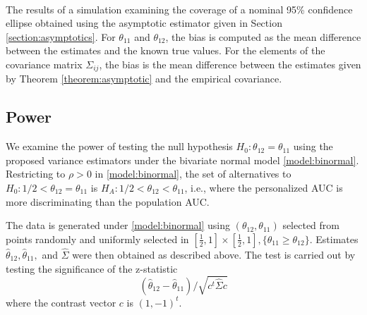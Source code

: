 \documentclass[12pt]{article}
\DeclareMathOperator{\AUC}{AUC}
\newcommand{\cind}{\perp \!\!\! \perp}
\newcommand{\aucindiv}{\theta_{11}}%
\newcommand{\aucpop}{\theta_{12}}%
\newcommand{\aucindivhat}{\hat{\theta}_{11}}%
\newcommand{\aucpophat}{\hat{\theta}_{12}}%
\newcommand{\comment}[1]{
  \iftoggle{commenttoggle}{
    {\normalsize{\color{red}{ #1}}\normalsize}
  }
  {}
}
\begin{document}
\begin{table}
  \\
    \caption{The results of a simulation examining the coverage of a nominal 95\% confidence ellipse obtained using the asymptotic estimator given in Section \ref{section:asymptotics}.\comment{make conssitent order of theta11 vs theta12 columns} For $\aucindiv$ and $\aucpop$, the bias is computed as the mean difference between the estimates and the known true values. For the elements of the covariance matrix $\Sigma_{ij}$, the bias is the mean difference between the estimates given by Theorem \ref{theorem:asymptotic}   and the empirical covariance.}
    \label{table:1}
\end{table}

%   



\subsection{Power}\label{section:simulation:power}

We examine the power of testing the null hypothesis
$H_0:\aucpop=\aucindiv$ using the proposed variance estimators under
the bivariate normal model \eqref{model:binormal}. Restricting to $\rho>0$ in
\eqref{model:binormal}, the set of alternatives to $H_0:1/2< \aucpop=\aucindiv$ is
 $H_A:1/2<\aucpop<\aucindiv$, i.e., where the
personalized AUC is more discriminating than the population AUC.

The data is generated under \eqref{model:binormal} using
$(\aucpop,\aucindiv)$ selected from points randomly and uniformly selected in
$[\frac{1}{2},1]\times[\frac{1}{2},1], \{\aucindiv\ge\aucpop\}$. Estimates
$\aucpophat,\aucindivhat,$ and $\hat\Sigma$ were then obtained as described
above. The test is carried out by testing the significance of the
z-statistic
$$
(\aucpophat-\aucindivhat) /
\sqrt{c^t\hat\Sigma c}
$$
where the contrast vector $c$ is $(1,-1)^t$.
\end{document}
